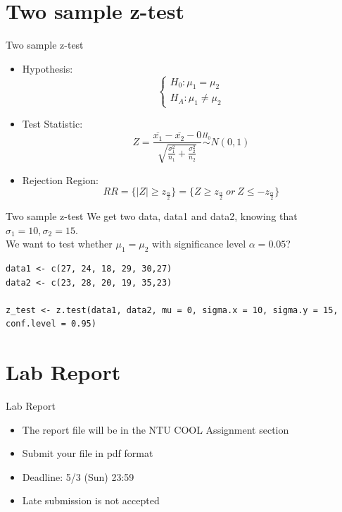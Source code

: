 \documentclass[aspectratio=169]{beamer}
\begin{document}
\section{Two sample z-test}
\begin{frame}{Two sample z-test}
\begin{itemize}
    \item Hypothesis:
    \[
    \begin{cases}
    H_0: \mu_1 = \mu_2 \\
    H_A: \mu_1 \neq \mu_2
    \end{cases}
    \]
    \item Test Statistic:
    \[
    Z = \frac{\overline{x_1}-\overline{x_2}-0}{\sqrt{\frac{\sigma_{1}^2}{n_1}+\frac{\sigma_{2}^2}{n_2}}} \overset{H_0}{\sim} N(0,1)
    \]
    \item Rejection Region:
    \[
    RR = \{\lvert Z \rvert \ge z_{\frac{\alpha}{2}}\} = \{Z \ge z_{\frac{\alpha}{2}}\ or\ Z \le -z_{\frac{\alpha}{2}}\}
    \]
\end{itemize}
\end{frame}

\begin{frame}[fragile]{Two sample z-test}
We get two data, data1 and data2, knowing that $\sigma_1 =10 , \sigma_2 = 15$. \\
We want to test whether $\mu_1 = \mu_2$ with significance level $\alpha =0.05$?
\begin{lstlisting}
data1 <- c(27, 24, 18, 29, 30,27)
data2 <- c(23, 28, 20, 19, 35,23)

z_test <- z.test(data1, data2, mu = 0, sigma.x = 10, sigma.y = 15, conf.level = 0.95)
\end{lstlisting}
\end{frame}




\section{Lab Report}
\begin{frame}{Lab Report}
\begin{itemize}
    \item The report file will be in the NTU COOL Assignment section
    \item Submit your file in pdf format
    \item Deadline: 5/3 (Sun) 23:59
    \item Late submission is not accepted
\end{itemize}
\end{frame}
\end{document}
